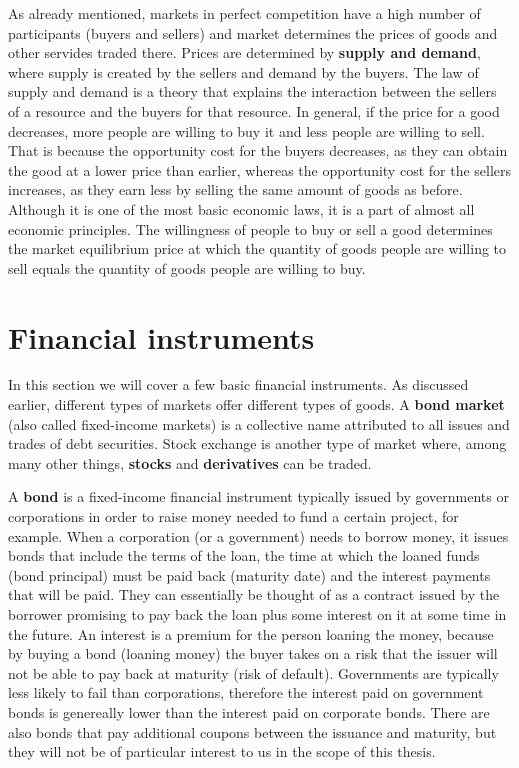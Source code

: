 \documentclass[times, utf8, diplomski]{fer}
\begin{document}
As already mentioned, markets in perfect competition have a high number of participants (buyers and sellers) and market determines the prices of goods and other servides traded there. Prices are determined by \textbf{supply and demand}, where supply is created by the sellers and demand by the buyers. The law of supply and demand is a theory that explains the interaction between the sellers of a resource and the buyers for that resource. In general, if the price for a good decreases, more people are willing to buy it and less people are willing to sell. That is because the opportunity cost for the buyers decreases, as they can obtain the good at a lower price than earlier, whereas the opportunity cost for the sellers increases, as they earn less by selling the same amount of goods as before. Although it is one of the most basic economic laws, it is a part of almost all economic principles. The willingness of people to buy or sell a good determines the market equilibrium price at which the quantity of goods people are willing to sell equals the quantity of goods people are willing to buy. 

\section{Financial instruments}
In this section we will cover a few basic financial instruments. As discussed earlier, different types of markets offer different types of goods. A \textbf{bond market} (also called fixed-income markets) is a collective name attributed to all issues and trades of debt securities. Stock exchange is another type of market where, among many other things, \textbf{stocks} and \textbf{derivatives} can be traded. 

\hfill \break
\indent A \textbf{bond} is a fixed-income financial instrument typically issued by governments or corporations in order to raise money needed to fund a certain project, for example. When a corporation (or a government) needs to borrow money, it issues bonds that include the terms of the loan, the time at which the loaned funds (bond principal) must be paid back (maturity date) and the interest payments that will be paid. They can essentially be thought of as a contract issued by the borrower promising to pay back the loan plus some interest on it at some time in the future. An interest is a premium for the person loaning the money, because by buying a bond (loaning money) the buyer takes on a risk that the issuer will not be able to pay back at maturity (risk of default). Governments are typically less likely to fail than corporations, therefore the interest paid on government bonds is genereally lower than the interest paid on corporate bonds. There are also bonds that pay additional coupons between the issuance and maturity, but they will not be of particular interest to us in the scope of this thesis.
\end{document}
